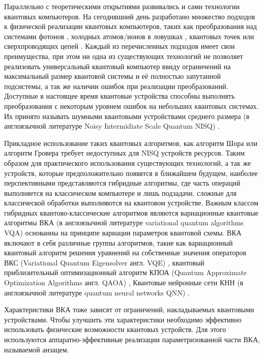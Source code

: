 \documentclass[14pt]{extarticle}
\begin{document}
\qquad Параллельно с теоретическими открытиями развивались и сами технологии квантовых компьютеров. На сегодняшний день разработано множество подходов к физической реализации квантовых компьютеров, таких как преобразования над системами фотонов \cite{RevModPhys.79.135}, холодных атомов/ионов  в ловушках \cite{PhysRevA.66.032309}, квантовых точек \cite{PhysRevA.57.120} или сверхпроводящих цепей \cite{PhysRevB.68.064509}. Каждый из перечисленных подходов имеет свои преимущества, при этом ни одна из существующих технологий не позволяет реализовать универсальный квантовый компьютер ввиду ограничений на максимальный размер квантовой системы и её полностью запутанной подсистемы, а так же наличии ошибок при реализации преобразований. Доступные в настоящее время квантовые устройства способны выполнять преобразования с некоторым уровнем ошибок на небольших квантовых системах. Их принято называть шумными квантовыми устройствами среднего размера (в англоязычной литературе Noisy Intermidiate Scale Quantum NISQ) \cite{Preskill2018quantumcomputingin}. 

\qquad Прикладное использование таких квантовых алгоритмов, как алгоритм Шора или алгоритм Гровера требует недоступных для NISQ устройств ресурсов. Таким образом для практического использования существующих технологий, а так же устройств, которые предположительно появятся в ближайшем будущем, наиболее перспективными представляются гибридные алгоритмы, где часть операций выполняется на классическом компьютере и лишь подзадачи, сложные для классической обработки выполняются на квантовом устройстве. Важным классом гибридных квантово-классические алгоритмов являются вариационные квантовые алгоритмы ВКА (в англоязычной литературе variational quantum algorithms VQA) \cite{Cerezo_2021} основанны на принципе вариации параметров квантовой схемы. ВКА включают в себя различные группы алгоритмов, такие как вариационный квантовый алгоритм решения уравнений на собственные значения операторов ВКС (Variational Quantum Eigensolver англ. VQE) \cite{VQE_review}, квантовый приблизительный оптимизационный алгоритм КПОА (Quantum Approximate Optimization Algorithms англ. QAOA) \cite{QAOA}, Квантовые нейронные сети КНН (в англоязычной литературе quantum neural networks QNN) \cite{KAK1995259}.

\qquad Характеристики ВКА тоже зависят от ограничений, накладываемых квантовыми устройствами. Чтобы улучшить эти характеристики необходимо эффективно использовать физические возможности квантовых устройств. Для этого используются аппаратно-эффективные реализации параметризованной части ВКА, называемой анзацем.
\end{document}
